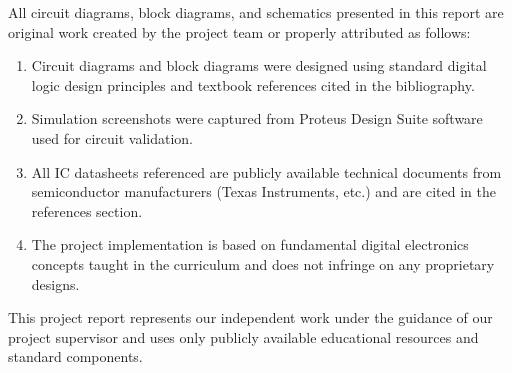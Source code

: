 All circuit diagrams, block diagrams, and schematics presented in this report are original work created by the project team or properly attributed as follows:

\begin{enumerate}
\item Circuit diagrams and block diagrams were designed using standard digital logic design principles and textbook references cited in the bibliography.

\item Simulation screenshots were captured from Proteus Design Suite software used for circuit validation.

\item All IC datasheets referenced are publicly available technical documents from semiconductor manufacturers (Texas Instruments, etc.) and are cited in the references section.

\item The project implementation is based on fundamental digital electronics concepts taught in the curriculum and does not infringe on any proprietary designs.
\end{enumerate}

This project report represents our independent work under the guidance of our project supervisor and uses only publicly available educational resources and standard components.
\par
